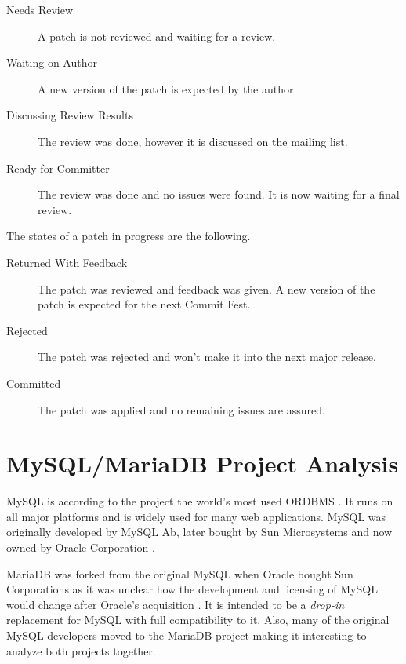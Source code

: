 \begin{description}

  \item[Needs Review] A patch is not reviewed and waiting for a review.

  \item[Waiting on Author] A new version of the patch is expected by the
    author.

  \item[Discussing Review Results] The review was done, however it is
    discussed on the mailing list.

  \item[Ready for Committer] The review was done and no issues were
    found. It is now waiting for a final review.

\end{description}

\noindent The states of a patch in progress are the following.

\begin{description}

  \item[Returned With Feedback] The patch was reviewed and feedback was
    given. A new version of the patch is expected for the next Commit Fest.

  \item[Rejected] The patch was rejected and won't make it into the next
    major release.

  \item[Committed] The patch was applied and no remaining issues are
    assured.

\end{description}


\section{MySQL/MariaDB Project Analysis} %


\noindent MySQL is according to the project the world's most used \ac{ORDBMS}
\cite{MySQLSun}. It runs on all major platforms and is widely used for many web
applications. MySQL was originally developed by MySQL Ab, later bought by Sun
Microsystems and now owned by Oracle Corporation
\cite{MySQLSun,MySQLOracle,MySQLHistory}.

MariaDB was forked from the original MySQL when Oracle bought Sun Corporations
as it was unclear how the development and licensing of MySQL would change after
Oracle's acquisition \cite{MySQLAbout,MySQLBehind}. It is intended to be a
\emph{drop-in} replacement for MySQL with full compatibility to it. Also, many
of the original MySQL developers moved to the MariaDB project making it
interesting to analyze both projects together.

